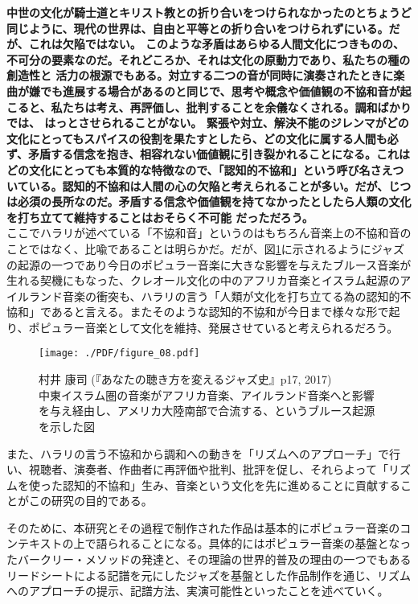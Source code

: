 \documentclass[uplatex,dvipdfmx]{ujarticle}
\begin{document}
{\bf 中世の文化が騎士道とキリスト教との折り合いをつけられなかったのとちょうど同じように、現代の世界は、自由と平等との折り合いをつけられずにいる。だが、これは欠陥ではない。 このような矛盾はあらゆる人間文化につきものの、不可分の要素なのだ。それどころか、それは文化の原動力であり、私たちの種の創造性と 活力の根源でもある。対立する二つの音が同時に演奏されたときに楽曲が嫌でも進展する場合があるのと同じで、思考や概念や価値観の不協和音が起こると、私たちは考え、再評価し、批判することを余儀なくされる。調和ばかりでは、 はっとさせられることがない。
緊張や対立、解決不能のジレンマがどの文化にとってもスパイスの役割を果たすとしたら、どの文化に属する人間も必ず、矛盾する信念を抱き、相容れない価値観に引き裂かれることになる。これはどの文化にとっても本質的な特徴なので、「認知的不協和」という呼び名さえついている。認知的不協和は人間の心の欠陥と考えられることが多い。だが、じつは必須の長所なのだ。矛盾する信念や価値観を持てなかったとしたら人類の文化を打ち立てて維持することはおそらく不可能 だっただろう。} \cite{harari:01}\\

ここでハラリが述べている「不協和音」というのはもちろん音楽上の不協和音のことではなく、比喩であることは明らかだ。だが、図\ref{fig:figure_08}\cite{murai:01}に示されるようにジャズの起源の一つであり今日のポピュラー音楽に大きな影響を与えたブルース音楽が生れる契機にもなった、クレオール文化の中のアフリカ音楽とイスラム起源のアイルランド音楽の衝突も、ハラリの言う「人類が文化を打ち立てる為の認知的不協和」であると言える。またそのような認知的不協和が今日まで様々な形で起り、ポピュラー音楽として文化を維持、発展させていると考えられるだろう。

\begin{figure}[ht]
\centerline{
	\texttt{[image: ./PDF/figure\_08.pdf]}
}
\caption{村井 康司 (『あなたの聴き方を変えるジャズ史』p17, 2017)\\
中東イスラム圏の音楽がアフリカ音楽、アイルランド音楽へと影響を与え経由し、アメリカ大陸南部で合流する、というブルース起源を示した図}
\label{fig:figure_08}
\end{figure}

また、ハラリの言う不協和から調和への動きを「リズムへのアプローチ」で行い、視聴者、演奏者、作曲者に再評価や批判、批評を促し、それらよって「リズムを使った認知的不協和」生み、音楽という文化を先に進めることに貢献することがこの研究の目的である。

そのために、本研究とその過程で制作された作品は基本的にポピュラー音楽のコンテキストの上で語られることになる。具体的にはポピュラー音楽の基盤となったバークリー・メソッドの発達と、その理論の世界的普及の理由の一つでもあるリードシートによる記譜を元にしたジャズを基盤とした作品制作を通じ、リズムへのアプローチの提示、記譜方法、実演可能性といったことを述べていく。
\end{document}

